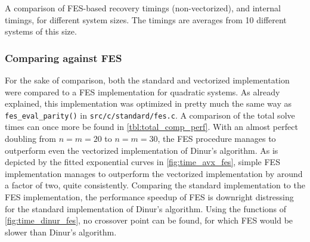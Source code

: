 \begin{table}[t]
    \begin{center}
    \end{center}
    \caption{A comparison of FES-based recovery timings (non-vectorized), and internal timings, for different system sizes. The timings are averages from 10 different systems of this size.} \label{tbl:fes_comp_perf}
\end{table}

\subsubsection{Comparing against FES}

For the sake of comparison, both the standard and vectorized implementation were compared to a FES implementation for quadratic systems. As already explained, this implementation was optimized in pretty much the same way as \texttt{fes\_eval\_parity()} in \texttt{src/c/standard/fes.c}. A comparison of the total solve times can once more be found in \cref{tbl:total_comp_perf}. With an almost perfect doubling from $n = m = 20$ to $n = m = 30$, the FES procedure manages to outperform even the vectorized implementation of Dinur's algorithm. As is depicted by the fitted exponential curves in \cref{fig:time_avx_fes}, simple FES implementation manages to outperform the vectorized implementation by around a factor of two, quite consistently. Comparing the standard implementation to the FES implementation, the performance speedup of FES is downright distressing for the standard implementation of Dinur's algorithm. Using the functions of \cref{fig:time_dinur_fes}, no crossover point can be found, for which FES would be slower than Dinur's algorithm.

